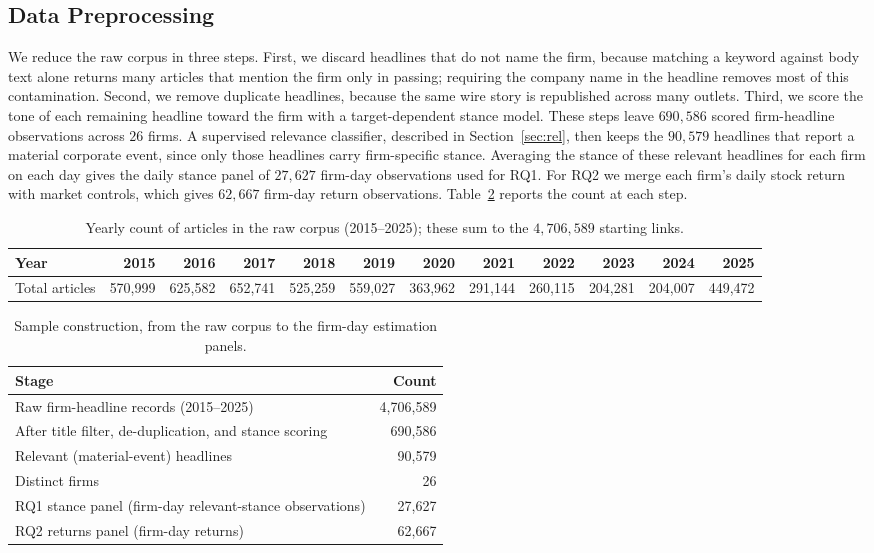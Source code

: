 \documentclass[conference]{IEEEtran}
\begin{document}
\subsection{Data Preprocessing}
We reduce the raw corpus in three steps. First, we discard headlines that do not
name the firm, because matching a keyword against body text alone returns many
articles that mention the firm only in passing; requiring the company name in the
headline removes most of this contamination. Second, we remove duplicate
headlines, because the same wire story is republished across many outlets. Third,
we score the tone of each remaining headline toward the firm with a
target-dependent stance model. These steps leave $690{,}586$ scored firm-headline
observations across $26$ firms. A supervised relevance classifier, described in
Section~\ref{sec:rel}, then keeps the $90{,}579$ headlines that report a material
corporate event, since only those headlines carry firm-specific stance. Averaging
the stance of these relevant headlines for each firm on each day gives the daily
stance panel of $27{,}627$ firm-day observations used for RQ1. For RQ2 we merge each
firm's daily stock return with market controls, which gives $62{,}667$ firm-day
return observations. Table~\ref{tab:pipeline} reports the count at each step.

\begin{table}[!t]
\caption{Yearly count of articles in the raw corpus (2015--2025); these sum to the $4{,}706{,}589$ starting links.}
\label{tab:yearly_matrix}
\centering
\begin{tabular}{lrrrrrrrrrrr}
\toprule
Year & 2015 & 2016 & 2017 & 2018 & 2019 & 2020 & 2021 & 2022 & 2023 & 2024 & 2025 \\
\midrule
Total articles & 570,999 & 625,582 & 652,741 & 525,259 & 559,027 & 363,962 & 291,144 & 260,115 & 204,281 & 204,007 & 449,472 \\
\bottomrule
\end{tabular}
\end{table}

\begin{table}[!t]
\caption{Sample construction, from the raw corpus to the firm-day estimation panels.}
\label{tab:pipeline}
\centering
\small
\begin{tabular}{lr}
\toprule
Stage & Count \\
\midrule
Raw firm-headline records (2015--2025) & 4,706,589 \\
After title filter, de-duplication, and stance scoring & 690,586 \\
Relevant (material-event) headlines & 90,579 \\
Distinct firms & 26 \\
RQ1 stance panel (firm-day relevant-stance observations) & 27,627 \\
RQ2 returns panel (firm-day returns) & 62,667 \\
\bottomrule
\end{tabular}
\end{table}
\end{document}
